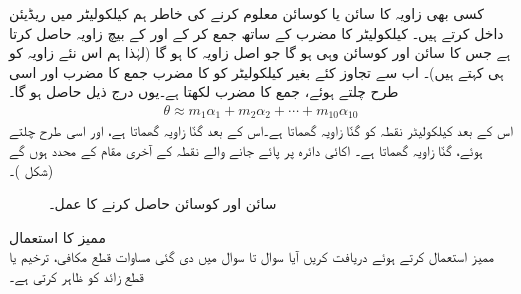 کسی بھی زاویہ  کا سائن یا کوسائن معلوم کرنے کی خاطر ہم کیلکولیٹر میں  ریڈیئن داخل کرتے ہیں۔ کیلکولیٹر  کا  مضرب  کے ساتھ جمع کر کے  اور  کے بیچ زاویہ حاصل کرتا ہے جس کا سائن اور کوسائن وہی ہو گا جو اصل زاویہ  کا ہو گا (لہٰذا ہم اس نئے زاویہ کو  ہی کہتے ہیں)۔ اب  سے تجاوز کئے بغیر کیلکولیٹر  کو  کا مضرب جمع  کا مضرب اور اسی طرح چلتے ہوئے، جمع   کا مضرب  لکھتا ہے۔یوں درج ذیل حاصل ہو گا۔
\begin{align*}
\theta\approx m_1\alpha_1+m_2\alpha_2+\cdots+m_{10}\alpha_{10}
\end{align*}
اس کے بعد کیلکولیٹر نقطہ  کو  گنّا  زاویہ گھماتا ہے۔اس کے بعد   گنّا  زاویہ گھماتا ہے، اور اسی طرح چلتے ہوئے،  گنّا  زاویہ گھماتا ہے۔ اکائی دائرہ پر پائے جانے والے نقطہ   کے آخری مقام کے محدد  ہوں گے (شکل )۔

\begin{figure}
\centering
{}
\caption{سائن اور کوسائن حاصل کرنے کا عمل۔}
\label{شکل_مخروط_کیلکولیٹر_سائن_کوسائن}
\end{figure}

{ممیز کا استعمال}\\
ممیز   استعمال کرتے ہوئے دریافت کریں آیا سوال  تا سوال  میں دی گئی مساوات قطع مکافی، ترخیم یا قطع زائد کو ظاہر کرتی ہے۔

